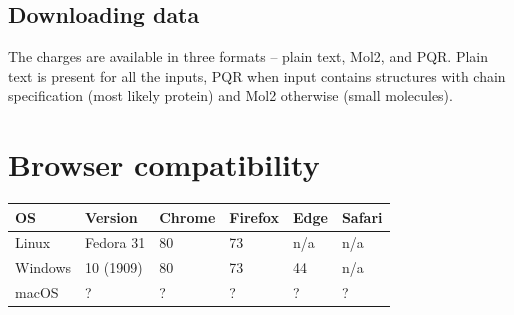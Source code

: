 \documentclass[oneside]{memoir}
\begin{document}
\subsection*{Downloading data}
The charges are available in three formats – plain text, Mol2, and PQR. Plain text is present for all the inputs, PQR when input contains structures with chain specification (most likely protein) and Mol2 otherwise (small molecules).

\section*{Browser compatibility}

\begin{tabular}{llllll}
\toprule
OS & Version & Chrome & Firefox & Edge & Safari\\
\midrule
Linux & Fedora 31 & 80 & 73 & n/a & n/a\\
Windows & 10 (1909) & 80 & 73 & 44 & n/a\\
macOS & ? & ? & ? & ? & ?\\
\bottomrule

\end{tabular}
\end{document}
